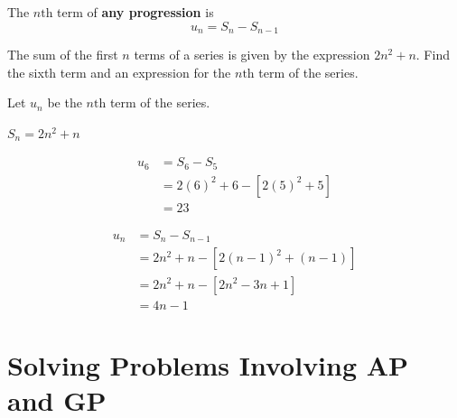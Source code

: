 \documentclass[11pt,a4paper]{book}
\begin{document}
\begin{tcolorbox}[colback=blue!5, colframe=black,boxrule=.4pt, sharpish corners]

The $n\text{th}$ term of \textbf{any progression} is 
\[
u_{n}=S_{n}-S_{n-1}
\]
\end{tcolorbox}

\begin{example}

The sum of the first $n$ terms of a series is given by the expression
$2n^{2}+n$. Find the sixth term and an expression for the $n\text{th}$
term of the series.

\Solution

Let $u_{n}$ be the $n\text{th}$ term of the series.

$S_{n}=2n^{2}+n$

\begin{align*}
u_{6} & =S_{6}-S_{5}\\
 & =2\left(6\right)^{2}+6-\left[2\left(5\right)^{2}+5\right]\\
 & =23
\end{align*}

\begin{align*}
u_{n} & =S_{n}-S_{n-1}\\
 & =2n^{2}+n-\left[2\left(n-1\right)^{2}+\left(n-1\right)\right]\\
 & =2n^{2}+n-\left[2n^{2}-3n+1\right]\\
 & =4n-1
\end{align*}

\end{example}

\section{Solving Problems Involving AP and GP}
\end{document}
